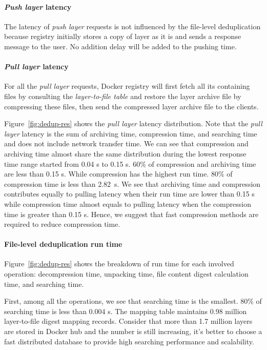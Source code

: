 \paragraph{\emph{Push layer} latency}

The latency of \emph{push layer} requests is not influenced by the
file-level deduplication because registry initially stores a copy of layer as it is
and sends a response message to the user. 
%
No addition delay will be added to the pushing time. 
%
\paragraph{\emph{Pull layer} latency} 

For all the \emph{pull layer} requests, Docker registry will first fetch 
all its containing files by consulting the \textit{layer-to-file table} and 
restore the layer archive file by compressing these files, 
then send the compressed layer archive file to the clients.

Figure~\ref{fig:dedup-res} shows the \emph{pull layer} latency
distribution. 
%
Note that the \emph{pull layer} latency is the sum of archiving time,
compression time, and searching time and does not include network transfer
time. 
%
We can see that compression and archiving time almost share the same
distribution during the lowest response time range started from 0.04 s to 0.15
s. 60\% of compression and archiving time are less than 0.15 s.
%
While
compression has the highest run time. 
%
80\% of compression time is less than 2.82~s. 
%
We see that archiving time and compression contributes equally to pulling
latency when their run time are lower than 0.15 s while compression time almost
equals to pulling latency when the compression time is greater than 0.15 s. 
%
Hence, we
suggest that fast compression methods are required to reduce compression time.

%

\paragraph{File-level deduplication run time}

%
Figure~\ref{fig:dedup-res} shows the breakdown of run time for each
involved operation: decompression time, unpacking time, file content digest
calculation time, and searching time.

First, among all the operations, we see that searching time is the
smallest. 
%
80\% of searching time is less than 0.004 s. 
%
The mapping table
maintains 0.98 million layer-to-file digest mapping records. 
%
Consider that more
than 1.7 million layers are stored in Docker hub and the number is still
increasing, it's better to choose a fast distributed database to provide high
searching performance and scalability.
%

